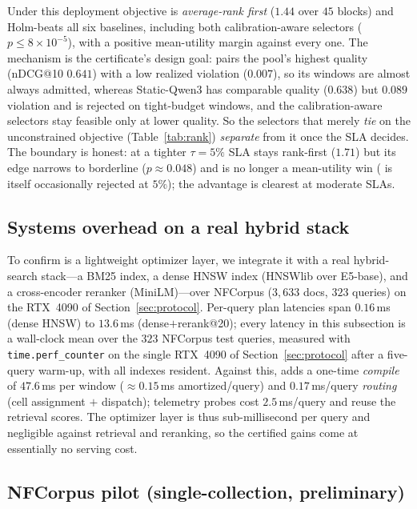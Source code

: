 Under this deployment objective \CWC{} is \emph{average-rank first} ($1.44$ over $45$ blocks) and Holm-beats all six baselines, including both calibration-aware selectors ($p\le8\times10^{-5}$), with a positive mean-utility margin against every one. The mechanism is the certificate's design goal: \CWC{} pairs the pool's highest quality (nDCG@10 $0.641$) with a low realized violation ($0.007$), so its windows are almost always admitted, whereas Static-Qwen3 has comparable quality ($0.638$) but $0.089$ violation and is rejected on tight-budget windows, and the calibration-aware selectors stay feasible only at lower quality. So the selectors that merely \emph{tie} \CWC{} on the unconstrained objective (Table~\ref{tab:rank}) \emph{separate} from it once the SLA decides. The boundary is honest: at a tighter $\tau{=}5\%$ SLA \CWC{} stays rank-first ($1.71$) but its edge narrows to borderline ($p\approx0.048$) and is no longer a mean-utility win (\CWC{} is itself occasionally rejected at $5\%$); the advantage is clearest at moderate SLAs.

\subsection{Systems overhead on a real hybrid stack}
\label{sec:results-overhead}
To confirm \CWC{} is a lightweight optimizer layer, we integrate it with a real hybrid-search stack---a BM25 index, a dense HNSW index (HNSWlib over E5-base), and a cross-encoder reranker (MiniLM)---over NFCorpus ($3{,}633$ docs, $323$ queries) on the RTX~4090 of Section~\ref{sec:protocol}. Per-query plan latencies span $0.16$\,ms (dense HNSW) to $13.6$\,ms (dense$+$rerank@20); every latency in this subsection is a wall-clock mean over the $323$ NFCorpus test queries, measured with \texttt{time.perf\_counter} on the single RTX~4090 of Section~\ref{sec:protocol} after a five-query warm-up, with all indexes resident. Against this, \CWC{} adds a one-time \emph{compile} of $47.6$\,ms per window ($\approx0.15$\,ms amortized/query) and $0.17$\,ms/query \emph{routing} (cell assignment $+$ dispatch); telemetry probes cost $2.5$\,ms/query and reuse the retrieval scores. The optimizer layer is thus sub-millisecond per query and negligible against retrieval and reranking, so the certified gains come at essentially no serving cost.

\subsection{NFCorpus pilot (single-collection, preliminary)}
\label{sec:results-pilot}

